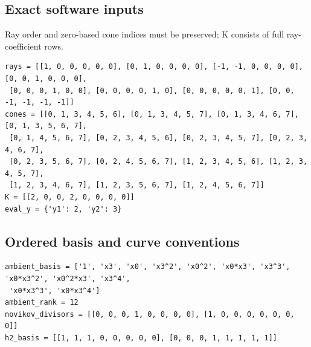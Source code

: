 \documentclass[10pt,a4paper]{article}
\begin{document}
\subsection*{Exact software inputs}
Ray order and zero-based cone indices must be preserved; K consists of full ray-coefficient rows.
\begin{lstlisting}
rays = [[1, 0, 0, 0, 0, 0], [0, 1, 0, 0, 0, 0], [-1, -1, 0, 0, 0, 0], [0, 0, 1, 0, 0, 0],
 [0, 0, 0, 1, 0, 0], [0, 0, 0, 0, 1, 0], [0, 0, 0, 0, 0, 1], [0, 0, -1, -1, -1, -1]]
cones = [[0, 1, 3, 4, 5, 6], [0, 1, 3, 4, 5, 7], [0, 1, 3, 4, 6, 7], [0, 1, 3, 5, 6, 7],
 [0, 1, 4, 5, 6, 7], [0, 2, 3, 4, 5, 6], [0, 2, 3, 4, 5, 7], [0, 2, 3, 4, 6, 7],
 [0, 2, 3, 5, 6, 7], [0, 2, 4, 5, 6, 7], [1, 2, 3, 4, 5, 6], [1, 2, 3, 4, 5, 7],
 [1, 2, 3, 4, 6, 7], [1, 2, 3, 5, 6, 7], [1, 2, 4, 5, 6, 7]]
K = [[2, 0, 0, 2, 0, 0, 0, 0]]
eval_y = {'y1': 2, 'y2': 3}
\end{lstlisting}
\subsection*{Ordered basis and curve conventions}
\begin{lstlisting}
ambient_basis = ['1', 'x3', 'x0', 'x3^2', 'x0^2', 'x0*x3', 'x3^3', 'x0*x3^2', 'x0^2*x3', 'x3^4',
 'x0*x3^3', 'x0*x3^4']
ambient_rank = 12
novikov_divisors = [[0, 0, 0, 1, 0, 0, 0, 0], [1, 0, 0, 0, 0, 0, 0, 0]]
h2_basis = [[1, 1, 1, 0, 0, 0, 0, 0], [0, 0, 0, 1, 1, 1, 1, 1]]
\end{lstlisting}
\end{document}
